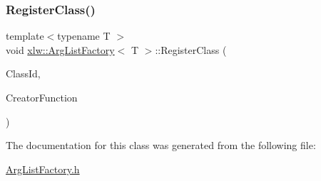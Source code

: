 \subsubsection{\texorpdfstring{Register\+Class()}{RegisterClass()}}
{\footnotesize\ttfamily template$<$typename T $>$ \\
void \hyperlink{classxlw_1_1ArgListFactory}{xlw\+::\+Arg\+List\+Factory}$<$ T $>$\+::Register\+Class (\begin{DoxyParamCaption}\item[{std\+::string}]{Class\+Id,  }\item[{\hyperlink{classxlw_1_1ArgListFactory_a2bd565ada3ddbebcec91aea216f90e22}{Create\+T\+Function}}]{Creator\+Function }\end{DoxyParamCaption})}



The documentation for this class was generated from the following file\+:\begin{DoxyCompactItemize}
\item 
\hyperlink{ArgListFactory_8h}{Arg\+List\+Factory.\+h}\end{DoxyCompactItemize}
